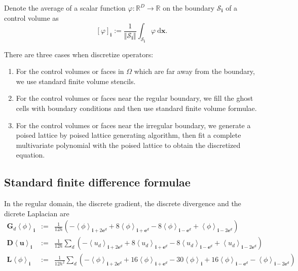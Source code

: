 \begin{defn}
  Denote the average of a scalar function
  $\varphi:\mathbb{R}^D\rightarrow\mathbb{R}$ on the boundary
  $\mathcal{S}_{\mathbf{i}}$ of a control volume as
  \begin{equation}
    \left[\varphi\right]_{\mathbf{i}} := \frac{1}{\Vert
      \mathcal{S}_{\mathbf{i}}\Vert}\int_{\mathcal{S}_{\mathbf{i}}}
    \varphi\  \mathrm{d}\mathbf{x}.
  \end{equation}
\end{defn}


There are three cases when discretize operators:
\begin{enumerate}
\item For the control volumes or faces in $\Omega$ which are far away
  from the boundary, we use standard finite volume stencils.
\item For the control volumes or faces near the regular boundary, we
  fill the ghost cells with boundary conditions and then use standard
  finite volume formulae.
\item For the control volumes or faces near the irregular boundary, we
  generate a poised lattice by poised lattice
  generating algorithm, then fit a complete
  multivariate polynomial with the poised lattice to obtain the
  discretized equation.
\end{enumerate}

\subsection{Standard finite difference formulae}
\label{sec:Standard}

In the regular domain, the discrete gradient, the discrete divergence and the dicrete
Laplacian are
\begin{eqnarray}
  \label{eq:G}
  \mathbf{G}_d\left<\phi\right>_{\mathbf{i}} &:=&
  \frac{1}{12h}\left(-\left<\phi\right>_{\mathbf{i}+2\mathbf{e}^d}
    +8\left<\phi\right>_{\mathbf{i}+\mathbf{e}^d}
    -8\left<\phi\right>_{\mathbf{i}-\mathbf{e}^d} 
  +\left<\phi\right>_{\mathbf{i}-2\mathbf{e}^d}\right) \\
  \label{eq:D}
  \mathbf{D}\left<\mathbf{u}\right>_{\mathbf{i}} &:=&
  \frac{1}{12h}\sum\limits_d \left( -\left<u_d\right>_{\mathbf{i}+2\mathbf{e}^d}
    +8\left<u_d\right>_{\mathbf{i}+\mathbf{e}^d}
    -8\left<u_d\right>_{\mathbf{i}-\mathbf{e}^d} 
                                                      +\left<u_d\right>_{\mathbf{i}-2\mathbf{e}^d}\right) \\
  \label{eq:L}
  \mathbf{L}\left<\phi\right>_{\mathbf{i}} &:=&
  \frac{1}{12h^2}\sum\limits_d\left(-\left<\phi\right>_{\mathbf{i}+2\mathbf{e}^d}
    +16\left<\phi\right>_{\mathbf{i}+\mathbf{e}^d} - 30\left<\phi\right>_{\mathbf{i}} 
    +16\left<\phi\right>_{\mathbf{i}-\mathbf{e}^d} 
  -\left<\phi\right>_{\mathbf{i}-2\mathbf{e}^d}\right) \\
\end{eqnarray}

